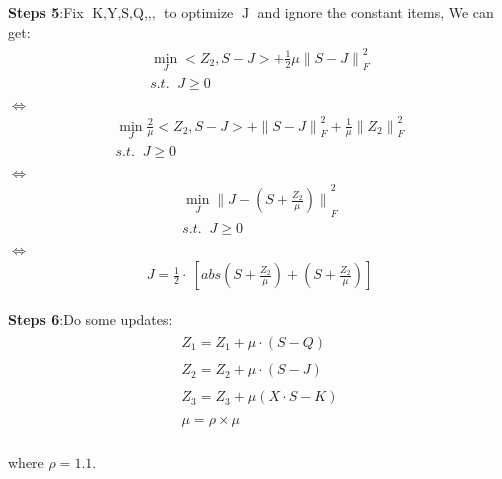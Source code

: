 \documentclass{article}
\begin{document}
\begin{flushleft}
\textbf{Steps 5}:\;\;Fix $\mathop{K,Y,S,Q,Z_1,Z_2,Z_3}$ to optimize $\mathop{J}$ and ignore the constant items, We can get:
\begin{eqnarray}
\begin{array}{l}
    \mathop{\min}\limits_{J} <Z_2,S-J> + \frac{1}{2}\mu {\parallel S - J \parallel}_F^2  \\
    s.t. \;\; J \geq 0\\
\end{array}
\end{eqnarray}
$\Longleftrightarrow$
\begin{eqnarray}
\begin{array}{l}
    \mathop{\min}\limits_{J} \frac{2}{\mu} <Z_2,S-J> + {\parallel S - J \parallel}_F^2  + \frac{1}{\mu}{\parallel Z_2\parallel}_F^2\\
    s.t. \;\; J \geq 0\\
\end{array}
\end{eqnarray}
$\Longleftrightarrow$
\begin{eqnarray}
\begin{array}{l}
    \mathop{\min}\limits_{J} {\parallel J-(S+ \frac{Z_2}{\mu} )\parallel}_F^2\\
    s.t. \;\; J \geq 0\\
\end{array}
\end{eqnarray}
$\Longleftrightarrow$
\begin{eqnarray}
\begin{array}{l}
    J=\frac{1}{2}\cdot\ [abs(S+ \frac{Z_2}{\mu})+ (S+ \frac{Z_2}{\mu})]
\end{array}
\end{eqnarray}
\end{flushleft}

\begin{flushleft}
\textbf{Steps 6}:\;\;Do some updates:
\begin{eqnarray}
\begin{array}{l}
Z_1 = Z_1 + \mu \cdot (S-Q)\\\\
Z_2 = Z_2 + \mu \cdot (S-J)\\\\
Z_3 = Z_3 + \mu (X\cdot S - K)\\\\
\mu = \rho \times \mu
\end{array}
\end{eqnarray}\\
where $\rho = 1.1 $.
\end{flushleft}
\end{document}
